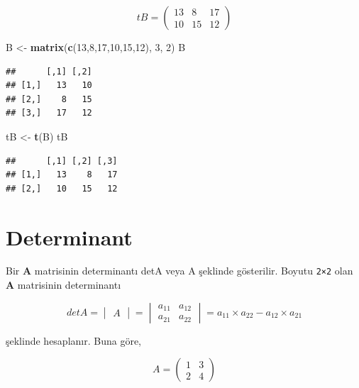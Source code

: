 \documentclass[
]{book}
\newenvironment{Shaded}{\begin{snugshade}}{\end{snugshade}}
\newcommand{\DecValTok}[1]{\textcolor[rgb]{0.00,0.00,0.81}{#1}}
\newcommand{\FunctionTok}[1]{\textcolor[rgb]{0.13,0.29,0.53}{\textbf{#1}}}
\newcommand{\NormalTok}[1]{#1}
\newcommand{\OtherTok}[1]{\textcolor[rgb]{0.56,0.35,0.01}{#1}}
\begin{document}
\[tB=
\begin{pmatrix}
 13 & 8 & 17 \\
 10 & 15 & 12
\end{pmatrix} \]

\begin{Shaded}
\begin{Highlighting}[]
\NormalTok{ B }\OtherTok{\textless{}{-}} \FunctionTok{matrix}\NormalTok{(}\FunctionTok{c}\NormalTok{(}\DecValTok{13}\NormalTok{,}\DecValTok{8}\NormalTok{,}\DecValTok{17}\NormalTok{,}\DecValTok{10}\NormalTok{,}\DecValTok{15}\NormalTok{,}\DecValTok{12}\NormalTok{), }\DecValTok{3}\NormalTok{, }\DecValTok{2}\NormalTok{) }
\NormalTok{ B }
\end{Highlighting}
\end{Shaded}

\begin{verbatim}
##      [,1] [,2]
## [1,]   13   10
## [2,]    8   15
## [3,]   17   12
\end{verbatim}

\begin{Shaded}
\begin{Highlighting}[]
\NormalTok{ tB }\OtherTok{\textless{}{-}} \FunctionTok{t}\NormalTok{(B)}
\NormalTok{ tB}
\end{Highlighting}
\end{Shaded}

\begin{verbatim}
##      [,1] [,2] [,3]
## [1,]   13    8   17
## [2,]   10   15   12
\end{verbatim}

\section{Determinant}\label{determinant}

Bir \textbf{A} matrisinin determinantı detA veya \textbar A\textbar{} şeklinde gösterilir. Boyutu \texttt{2×2} olan \textbf{A} matrisinin determinantı

\[detA=
\begin{vmatrix}
 A
\end{vmatrix}
=   
\begin{vmatrix}
 a_{11} & a_{12} \\
 a_{21} & a_{22} 
\end{vmatrix}
=
 a_{11}×a_{22}-a_{12}×a_{21}\]

şeklinde hesaplanır. Buna göre,

\[A=
\begin{pmatrix}
 1 & 3 \\
 2 & 4 
\end{pmatrix}\]
\end{document}
